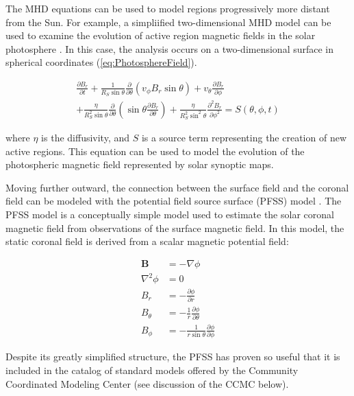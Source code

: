 \documentclass{article}
\begin{document}
The MHD equations can be used to model regions progressively more distant from the Sun. For example, a simpliified two-dimensional MHD model can be used to examine the evolution of active region magnetic fields in the solar photosphere \cite{russell2016}. In this case, the analysis occurs on a two-dimensional surface in spherical coordinates (\ref{eq:PhotosphereField}).

\begin{equation}
\begin{split}
    \frac {\partial B_r} {\partial t} + \frac {1} {R_S \sin \theta} \frac {\partial} {\partial \theta} \left( v_{\phi} B_r \sin \theta \right) + v_{\theta} \frac {\partial B_r} {\partial \phi} \\
    + \frac {\eta} {R_S^2 \sin \theta} \frac {\partial} {\partial \theta} \left( \sin \theta \frac {\partial B_r} {\partial \theta} \right) + \frac {\eta} {R_S^2 \sin^2 \theta} \frac {\partial^2 B_r} {\partial \phi^2} = S(\theta, \phi, t)
    \label{eq:PhotosphereField}
\end{split}
\end{equation}

\noindent where $\eta$ is the diffusivity, and $S$ is a source term representing the creation of new active regions. This equation can be used to model the evolution of the photospheric magnetic field represented by solar synoptic maps.

Moving further outward, the connection between the surface field and the coronal field can be modeled with the potential field source surface (PFSS) model \cite{Altschuler1969}. The PFSS model is a conceptually simple model used to estimate the solar coronal magnetic field from observations of the surface magnetic field. In this model, the static coronal field is derived from a scalar magnetic potential field:

\begin{align}
    \mathbf B &= - \nabla \phi \\
    \nabla^2 \phi &= 0 \\
    B_r &= - \frac {\partial \phi} {\partial r} \\
    B_{\theta} &= - \frac {1} {r} \frac {\partial \phi} {\partial \theta} \\
    B_{\phi} &= - \frac {1} {r \sin \theta} \frac {\partial \phi} {\partial \phi}
    \label{eq:PFSS}
\end{align}

\noindent Despite its greatly simplified structure, the PFSS has proven so useful that it is included in the catalog of standard models offered by the Community Coordinated Modeling Center (see discussion of the CCMC below).
\end{document}
